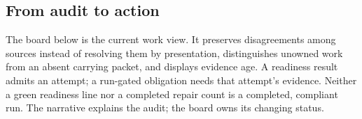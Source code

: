 \subsection*{From audit to action}

The board below is the current work view. It preserves disagreements among
sources instead of resolving them by presentation, distinguishes unowned work
from an absent carrying packet, and displays evidence age. A readiness result
admits an attempt; a run-gated obligation needs that attempt's evidence.
Neither a green readiness line nor a completed repair count is a completed,
compliant run. The narrative explains the audit; the board owns its changing
status.

\clearpage

\clearpage
